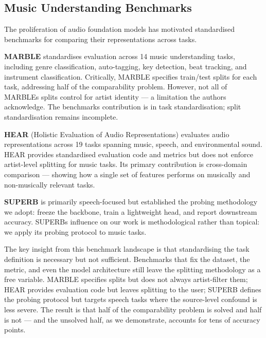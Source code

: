 \documentclass[conference]{IEEEtran}
\begin{document}
\subsection{Music Understanding
Benchmarks}\label{d.-music-understanding-benchmarks}

The proliferation of audio foundation models has motivated standardised
benchmarks for comparing their representations across tasks.

\textbf{MARBLE} \citep{yuan2024marble} standardises evaluation across 14
music understanding tasks, including genre classification, auto-tagging,
key detection, beat tracking, and instrument classification. Critically,
MARBLE specifies train/test splits for each task, addressing half of the
comparability problem. However, not all of MARBLE\textquotesingle s
splits control for artist identity --- a limitation the authors
acknowledge. The benchmark\textquotesingle s contribution is in task
standardisation; split standardisation remains incomplete.

\textbf{HEAR} (Holistic Evaluation of Audio Representations)
\citep{turian2022hear} evaluates audio representations across 19 tasks
spanning music, speech, and environmental sound. HEAR provides
standardised evaluation code and metrics but does not enforce
artist-level splitting for music tasks. Its primary contribution is
cross-domain comparison --- showing how a single set of features
performs on musically and non-musically relevant tasks.

\textbf{SUPERB} \citep{yang2021superb} is primarily speech-focused but
established the probing methodology we adopt: freeze the backbone, train
a lightweight head, and report downstream accuracy.
SUPERB\textquotesingle s influence on our work is methodological rather
than topical: we apply its probing protocol to music tasks.

The key insight from this benchmark landscape is that standardising the
task definition is necessary but not sufficient. Benchmarks that fix the
dataset, the metric, and even the model architecture still leave the
splitting methodology as a free variable. MARBLE specifies splits but
does not always artist-filter them; HEAR provides evaluation code but
leaves splitting to the user; SUPERB defines the probing protocol but
targets speech tasks where the source-level confound is less severe. The
result is that half of the comparability problem is solved and half is
not --- and the unsolved half, as we demonstrate, accounts for tens
of accuracy points.
\end{document}
